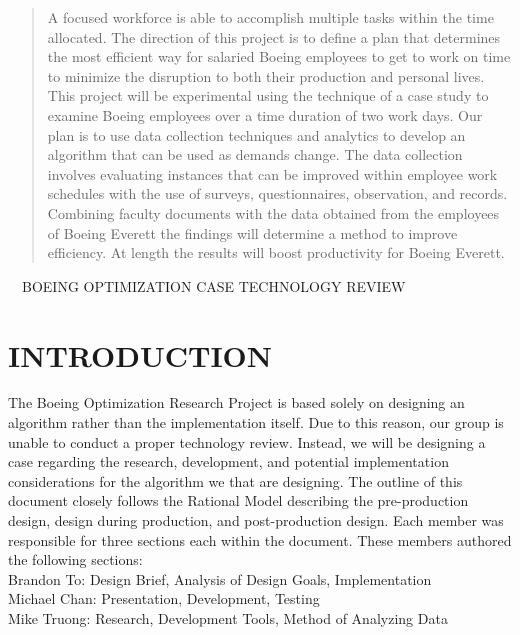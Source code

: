 \documentclass[a4,draftclsnofoot,onecolumn,margin=0.75,10pt]{IEEEtran}
\begin{document}
\begin{abstract}A focused workforce is able to accomplish multiple tasks within the time allocated. The direction of this project is to define a plan that determines the most efficient way for salaried Boeing employees to get to work on time to minimize the disruption to both their production and personal lives. This project will be experimental using the technique of a case study to examine Boeing employees over a time duration of two work days. 
Our plan is to use data collection techniques and analytics to develop an algorithm that can be used as demands change. 
The data collection involves evaluating instances that can be improved within employee work schedules with the use of surveys, questionnaires, observation, and records. 
Combining faculty documents with the data obtained from the employees of Boeing Everett the findings will determine a method to improve efficiency. At length the results will boost productivity for Boeing Everett. 
\end{abstract}



\clearpage\
\foreignlanguage{english}{\MakeUppercase{\ }}\foreignlanguage{english}{\MakeUppercase{Boeing Optimization Case Technology Review}}
\par







\bigskip


\tableofcontents


\bigskip

\clearpage\setcounter{page}{1}

\section[INTRODUCTION]{\rmfamily\bfseries\color{black}
INTRODUCTION}
{\color{black}
}
{\color{black}
The Boeing Optimization Research Project is based solely on designing an algorithm rather than the implementation itself. Due to this reason, our group is unable to conduct a proper technology review. Instead, we will be designing a case regarding the research, development, and potential implementation considerations for the algorithm we that are designing. The outline of this document closely follows the Rational Model describing the pre-production design, design during production, and post-production design. Each member was responsible for three sections each within the document. These members authored the following sections:\\ 
Brandon To: Design Brief, Analysis of Design Goals, Implementation\\ 
Michael Chan: Presentation, Development, Testing\\
Mike Truong: Research, Development Tools, Method of Analyzing Data}
\end{document}
